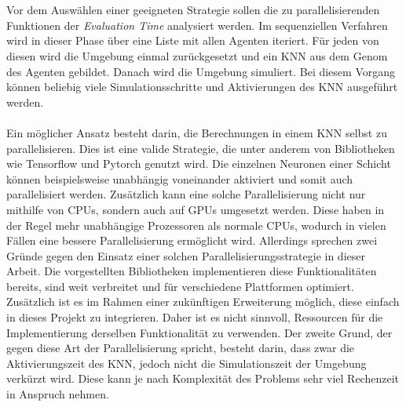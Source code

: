 \\\\
Vor dem Auswählen einer geeigneten Strategie sollen die zu parallelisierenden Funktionen der \emph{Evaluation Time} analysiert werden. Im sequenziellen Verfahren wird in dieser Phase über eine Liste mit allen Agenten iteriert. Für jeden von diesen wird die Umgebung einmal zurückgesetzt und ein \ac{KNN} aus dem Genom des Agenten gebildet. Danach wird die Umgebung simuliert. Bei diesem Vorgang können beliebig viele Simulationsschritte und Aktivierungen des \ac{KNN} ausgeführt werden. 
\\\\
Ein möglicher Ansatz besteht darin, die Berechnungen in einem \ac{KNN} selbst zu parallelisieren. Dies ist eine valide Strategie, die unter anderem von Bibliotheken wie Tensorflow und Pytorch genutzt wird. Die einzelnen Neuronen einer Schicht können beispielsweise unabhängig voneinander aktiviert und somit auch parallelisiert werden. Zusätzlich kann eine solche Parallelisierung nicht nur mithilfe von \acp{CPU}, sondern auch auf \acp{GPU} umgesetzt werden. Diese haben in der Regel mehr unabhängige Prozessoren als normale \acp{CPU}, wodurch in vielen Fällen eine bessere Parallelisierung ermöglicht wird. Allerdings sprechen zwei Gründe gegen den Einsatz einer solchen Parallelisierungsstrategie in dieser Arbeit. Die vorgestellten Bibliotheken implementieren diese Funktionalitäten bereits, sind weit verbreitet und für verschiedene Plattformen optimiert. Zusätzlich ist es im Rahmen einer zukünftigen Erweiterung möglich, diese einfach in dieses Projekt zu integrieren. Daher ist es nicht sinnvoll, Ressourcen für die Implementierung derselben Funktionalität zu verwenden. Der zweite Grund, der gegen diese Art der Parallelisierung spricht, besteht darin, dass zwar die Aktivierungszeit des \ac{KNN}, jedoch nicht die Simulationszeit der Umgebung verkürzt wird. Diese kann je nach Komplexität des Problems sehr viel Rechenzeit in Anspruch nehmen. 
\\\\
